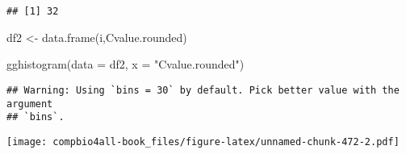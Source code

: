 \documentclass[
]{book}
\newenvironment{Shaded}{\begin{snugshade}}{\end{snugshade}}
\newcommand{\AttributeTok}[1]{\textcolor[rgb]{0.77,0.63,0.00}{#1}}
\newcommand{\FunctionTok}[1]{\textcolor[rgb]{0.00,0.00,0.00}{#1}}
\newcommand{\NormalTok}[1]{#1}
\newcommand{\OtherTok}[1]{\textcolor[rgb]{0.56,0.35,0.01}{#1}}
\newcommand{\StringTok}[1]{\textcolor[rgb]{0.31,0.60,0.02}{#1}}
\begin{document}
\begin{verbatim}
## [1] 32
\end{verbatim}

\begin{Shaded}
\begin{Highlighting}[]
\NormalTok{df2 }\OtherTok{\textless{}{-}} \FunctionTok{data.frame}\NormalTok{(i,Cvalue.rounded)}

\FunctionTok{gghistogram}\NormalTok{(}\AttributeTok{data =}\NormalTok{ df2, }\AttributeTok{x =} \StringTok{"Cvalue.rounded"}\NormalTok{)}
\end{Highlighting}
\end{Shaded}

\begin{verbatim}
## Warning: Using `bins = 30` by default. Pick better value with the argument
## `bins`.
\end{verbatim}

\texttt{[image: compbio4all-book\_files/figure-latex/unnamed-chunk-472-2.pdf]}
\end{document}
